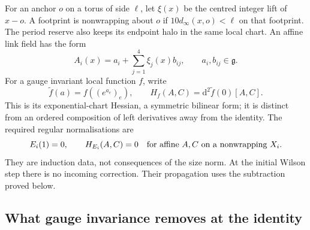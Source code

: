 \documentclass[11pt,reqno]{amsart}
\numberwithin{equation}{section}
\theoremstyle{definition}
\theoremstyle{remark}
\newcommand{\dd}{\mathrm d}
\newcommand{\g}{\mathfrak g}
\begin{document}
For an anchor \(o\) on a torus of side \(\ell\), let
\(\xi(x)\) be the centred integer lift of \(x-o\). A footprint
is nonwrapping about \(o\) if
\(10d_\infty(x,o)<\ell\) on that footprint. The period
reserve also keeps its endpoint halo in the same local chart.
An affine link field has the form
\begin{equation}
 A_i(x)=a_i+\sum_{j=1}^4\xi_j(x)b_{ij},\qquad
                         a_i,b_{ij}\in\g.
 \label{eq:reset-affine-field}
\end{equation}
For a gauge invariant local function \(f\), write
\[
 \widetilde f(a)=f((e^{a_e})_e),\qquad
 H_f(A,C)=\dd^2\widetilde f(0)[A,C].
\]
This is its exponential-chart Hessian, a symmetric bilinear
form; it is distinct from an ordered composition of left
derivatives away from the identity. The required regular
normalisations are
\begin{equation}
 E_i(1)=0,\qquad H_{E_i}(A,C)=0
       \quad\hbox{for affine }A,C
       \hbox{ on a nonwrapping }X_i.
 \label{eq:reset-incoming-normalisations}
\end{equation}
They are induction data, not consequences of the size norm.
At the initial Wilson step there is no incoming correction.
Their propagation uses the subtraction proved below.

\subsection{What gauge invariance removes at the identity}
\end{document}
